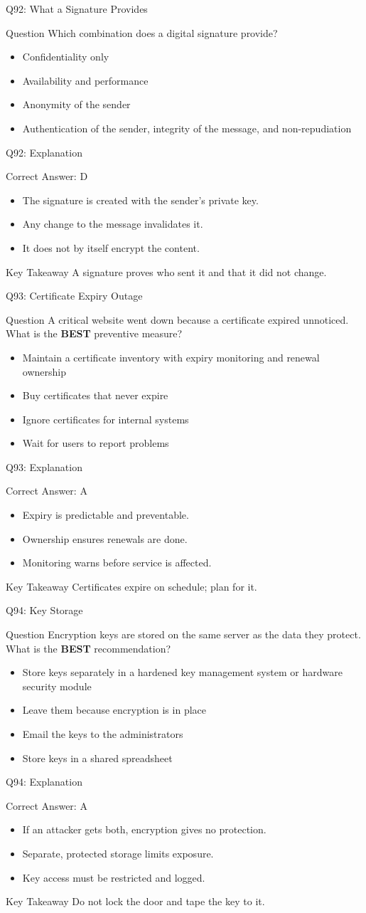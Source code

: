 \documentclass[aspectratio=169]{beamer}
\newcommand{\hq}[7]{%
	\begin{frame}{Q#1: #2}
		\begin{block}{Question}
			#3
		\end{block}
		\begin{itemize}
			#4
		\end{itemize}
	\end{frame}
	\begin{frame}{Q#1: Explanation}
		\begin{block}{Correct Answer: #5}
			\begin{itemize}
				#6
			\end{itemize}
		\end{block}
		\begin{alertblock}{Key Takeaway}
			#7
		\end{alertblock}
	\end{frame}
}
\begin{document}
	\hq{92}{What a Signature Provides}
	{Which combination does a digital signature provide?}
	{\item[\textbf{(A)}] Confidentiality only
		\item[\textbf{(B)}] Availability and performance
		\item[\textbf{(C)}] Anonymity of the sender
		\item[\textbf{(D)}] Authentication of the sender, integrity of the message, and non-repudiation}
	{D}
	{\item The signature is created with the sender's private key.
		\item Any change to the message invalidates it.
		\item It does not by itself encrypt the content.}
	{A signature proves who sent it and that it did not change.}
	
	\hq{93}{Certificate Expiry Outage}
	{A critical website went down because a certificate expired unnoticed. What is the \textbf{BEST} preventive measure?}
	{\item[\textbf{(A)}] Maintain a certificate inventory with expiry monitoring and renewal ownership
		\item[\textbf{(B)}] Buy certificates that never expire
		\item[\textbf{(C)}] Ignore certificates for internal systems
		\item[\textbf{(D)}] Wait for users to report problems}
	{A}
	{\item Expiry is predictable and preventable.
		\item Ownership ensures renewals are done.
		\item Monitoring warns before service is affected.}
	{Certificates expire on schedule; plan for it.}
	
	\hq{94}{Key Storage}
	{Encryption keys are stored on the same server as the data they protect. What is the \textbf{BEST} recommendation?}
	{\item[\textbf{(A)}] Store keys separately in a hardened key management system or hardware security module
		\item[\textbf{(B)}] Leave them because encryption is in place
		\item[\textbf{(C)}] Email the keys to the administrators
		\item[\textbf{(D)}] Store keys in a shared spreadsheet}
	{A}
	{\item If an attacker gets both, encryption gives no protection.
		\item Separate, protected storage limits exposure.
		\item Key access must be restricted and logged.}
	{Do not lock the door and tape the key to it.}
	
\end{document}

